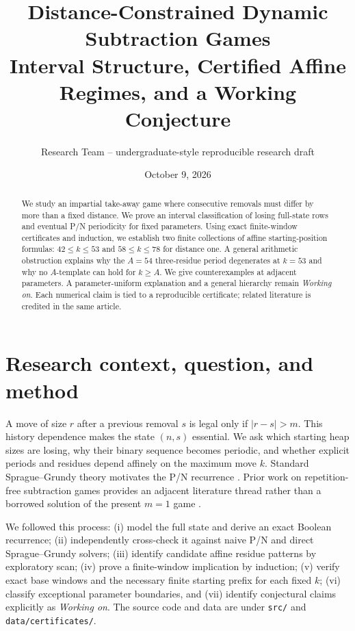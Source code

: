 \documentclass[11pt]{article}
\title{\textbf{Distance-Constrained Dynamic Subtraction Games}\\[0.4em]
\large Interval Structure, Certified Affine Regimes, and a Working Conjecture}
\author{Research Team -- undergraduate-style reproducible research draft}
\date{October 9, 2026}
\begin{document}
\maketitle
\begin{abstract}
We study an impartial take-away game where consecutive removals must differ by more than a fixed distance. We prove an interval classification of losing full-state rows and eventual P/N periodicity for fixed parameters. Using exact finite-window certificates and induction, we establish two finite collections of affine starting-position formulas: $42\le k\le53$ and $58\le k\le78$ for distance one. A general arithmetic obstruction explains why the $A=54$ three-residue period degenerates at $k=53$ and why no $A$-template can hold for $k\ge A$. We give counterexamples at adjacent parameters. A parameter-uniform explanation and a general hierarchy remain \emph{Working on}. Each numerical claim is tied to a reproducible certificate; related literature is credited in the same article.
\end{abstract}
\tableofcontents
\section{Research context, question, and method}
A move of size $r$ after a previous removal $s$ is legal only if $|r-s|>m$. This history dependence makes the state $(n,s)$ essential. We ask which starting heap sizes are losing, why their binary sequence becomes periodic, and whether explicit periods and residues depend affinely on the maximum move $k$. Standard Sprague--Grundy theory motivates the P/N recurrence \cite{sprague1935,grundy1939,winningways2001}. Prior work on repetition-free subtraction games provides an adjacent literature thread rather than a borrowed solution of the present $m=1$ game \cite{gurvich2012}.

We followed this process: (i) model the full state and derive an exact Boolean recurrence; (ii) independently cross-check it against naive P/N and direct Sprague--Grundy solvers; (iii) identify candidate affine residue patterns by exploratory scan; (iv) prove a finite-window implication by induction; (v) verify exact base windows and the necessary finite starting prefix for each fixed $k$; (vi) classify exceptional parameter boundaries, and (vii) identify conjectural claims explicitly as \emph{Working on}. The source code and data are under \texttt{src/} and \texttt{data/certificates/}.



\end{document}
